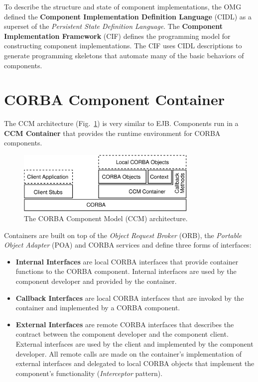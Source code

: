 \vspace{3mm}
\noindent
To describe the structure and state of component implementations, the OMG 
defined the {\bf Component Implementation Definition Language} (CIDL) as a 
superset of the {\it Persistent State Definition Language}.
The {\bf Component Implementation Framework} (CIF) defines the programming model
for constructing component implementations.
The CIF uses CIDL descriptions to generate programming skeletons that automate
many of the basic behaviors of components.

\section{CORBA Component Container}
The CCM architecture (Fig.~\ref{CCMArchitecture}) is very similar to EJB.
Components run in a {\bf CCM Container} that provides the runtime environment 
for CORBA components.

\begin{figure}[htbp]
    \begin{center}
    \includegraphics [height=3cm,angle=0] {figures/CCMArchitecture}
    \caption{The CORBA Component Model (CCM) architecture.}
    \label{CCMArchitecture}            
    \end{center}
\end{figure}

\noindent
Containers are built on top of the {\it Object Request Broker} (ORB), the 
{\it Portable Object Adapter} (POA) and CORBA services and define three forms 
of interfaces:
\begin{itemize}
\item {\bf Internal Interfaces} are local CORBA interfaces that provide 
container functions to the CORBA component. Internal interfaces are used by the 
component developer and provided by the container. 
\item {\bf Callback Interfaces} are local CORBA interfaces that are invoked by 
the container and implemented by a CORBA component.
\item {\bf External Interfaces} are remote CORBA interfaces that describes the 
contract between the component developer and the component client.
External interfaces are used by the client and implemented by the component 
developer.
All remote calls are made on the container's implementation of external 
interfaces and delegated to local CORBA objects that implement the 
component's functionality ({\it Interceptor} pattern).  
\end{itemize}



